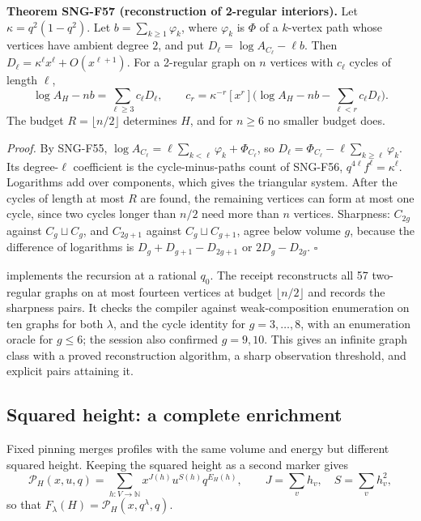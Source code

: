 \documentclass[
  11pt,
  a4paper,
]{report}
\let\singularitytexttt\texttt
\renewcommand{\texttt}[1]{\singularitytexttt{\seqsplit{#1}}}
\begin{document}
\textbf{Theorem SNG-F57 (reconstruction of 2-regular interiors).} Let
\(\kappa=q^2(1-q^2)\). Let \(b=\sum_{k\ge1}\varphi_k\), where
\(\varphi_k\) is \(\Phi\) of a \(k\)-vertex path whose vertices have
ambient degree \(2\), and put \(D_\ell=\log A_{C_\ell}-\ell b\). Then
\(D_\ell=\kappa^\ell x^\ell+O(x^{\ell+1})\). For a 2-regular graph on
\(n\) vertices with \(c_\ell\) cycles of length \(\ell\), \[
\log A_H-nb=\sum_{\ell\ge3}c_\ell D_\ell,\qquad c_r=\kappa^{-r}[x^r]\bigl(\log A_H-nb-\sum_{\ell<r}c_\ell D_\ell\bigr).
\] The budget \(R=\lfloor n/2\rfloor\) determines \(H\), and for
\(n\ge6\) no smaller budget does.

\emph{Proof.} By SNG-F55,
\(\log A_{C_\ell}=\ell\sum_{k<\ell}\varphi_k+\Phi_{C_\ell}\), so
\(D_\ell=\Phi_{C_\ell}-\ell\sum_{k\ge\ell}\varphi_k\). Its
degree-\(\ell\) coefficient is the cycle-minus-paths count of SNG-F56,
\(q^{4\ell}f^\ell=\kappa^\ell\). Logarithms add over components, which
gives the triangular system. After the cycles of length at most \(R\)
are found, the remaining vertices can form at most one cycle, since two
cycles longer than \(n/2\) need more than \(n\) vertices. Sharpness:
\(C_{2g}\) against \(C_g\sqcup C_g\), and \(C_{2g+1}\) against
\(C_g\sqcup C_{g+1}\), agree below volume \(g\), because the difference
of logarithms is \(D_g+D_{g+1}-D_{2g+1}\) or \(2D_g-D_{2g}\).
\(\square\)

\texttt{reconstruct\_cycle\_type} implements the recursion at a rational
\(q_0\). The receipt reconstructs all 57 two-regular graphs on at most
fourteen vertices at budget \(\lfloor n/2\rfloor\) and records the
sharpness pairs. It checks the compiler against weak-composition
enumeration on ten graphs for both \(\lambda\), and the cycle identity
for \(g=3,\ldots,8\), with an enumeration oracle for \(g\le6\); the
session also confirmed \(g=9,10\). This gives an infinite graph class
with a proved reconstruction algorithm, a sharp observation threshold,
and explicit pairs attaining it.

\hypertarget{squared-height-a-complete-enrichment}{%
\subsection{Squared height: a complete
enrichment}\label{squared-height-a-complete-enrichment}}

Fixed pinning merges profiles with the same volume and energy but
different squared height. Keeping the squared height as a second marker
gives \[
\mathcal P_H(x,u,q)=\sum_{h:V\to\mathbb N}x^{J(h)}u^{S(h)}q^{E_H(h)},\qquad J=\sum_vh_v,\quad S=\sum_vh_v^2,
\] so that \(F_\lambda(H)=\mathcal P_H(x,q^\lambda,q)\).
\end{document}
